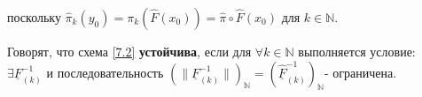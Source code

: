 \documentclass[__main__.tex]{subfiles}
\begin{document}
поскольку $\hat{\pi}_k \left(y_0\right) = \pi_k \left(\hat{F}\left(x_0\right)\right) = \hat{\pi} \circ \hat{F} \left(x_0\right)$ для $k\in\mathbb{N}$.

Говорят, что схема \ref{7.2} \textbf{устойчива}, если для $\forall k \in\mathbb{N}$ выполняется условие: $\exists \underline{F}^{-1}_{\left(k\right)}$ и последовательность $\left(\| \underline{F}^{-1}_{\left(k\right)} \|\right)_{\mathbb{N}} = \left(\underline{\hat{F}}^{-1}_{\left(k\right)}\right)_{\mathbb{N}}$- ограничена.
\end{document}
